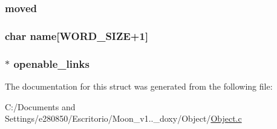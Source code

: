 \hypertarget{struct___object_a72d230d97bc8e2725c8c8c2a52cd47b7}{
\subsubsection[{moved}]{ moved}}\label{struct___object_a72d230d97bc8e2725c8c8c2a52cd47b7}
\hypertarget{struct___object_a2b7341aac5f9360a8e88ae1061f497d2}{
\subsubsection[{name}]{\setlength{\rightskip}{0pt plus 5cm}char name\mbox{[}{\bf W\+O\+R\+D\+\_\+\+S\+I\+Z\+E}+1\mbox{]}}}\label{struct___object_a2b7341aac5f9360a8e88ae1061f497d2}
\hypertarget{struct___object_af2a87b4aa7c9b00685229df2324c262d}{
\subsubsection[{openable\+\_\+links}]{$\ast$ openable\+\_\+links}}\label{struct___object_af2a87b4aa7c9b00685229df2324c262d}


The documentation for this struct was generated from the following file\+:\begin{DoxyCompactItemize}
\item 
C\+:/\+Documents and Settings/e280850/\+Escritorio/\+Moon\+\_\+v1..\+\_\+doxy/\+Object/\hyperlink{_object_8c}{Object.\+c}\end{DoxyCompactItemize}
